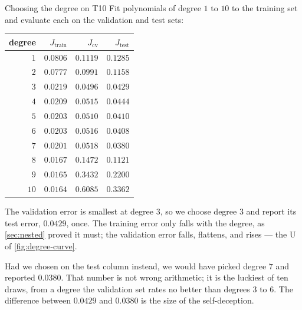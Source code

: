 \begin{workedexample}{Choosing the degree on T10}
Fit polynomials of degree $1$ to $10$ to the training set and evaluate each on
the validation and test sets:

\begin{center}
\small
\renewcommand{\arraystretch}{1.15}
\begin{tabular}{@{}rrrr@{}}
\toprule
degree & $J_{\text{train}}$ & $J_{\text{cv}}$ & $J_{\text{test}}$\\
\midrule
$1$  & $0.0806$ & $0.1119$ & $0.1285$\\
$2$  & $0.0777$ & $0.0991$ & $0.1158$\\
$3$  & $0.0219$ & $\mathbf{0.0496}$ & $0.0429$\\
$4$  & $0.0209$ & $0.0515$ & $0.0444$\\
$5$  & $0.0203$ & $0.0510$ & $0.0410$\\
$6$  & $0.0203$ & $0.0516$ & $0.0408$\\
$7$  & $0.0201$ & $0.0518$ & $0.0380$\\
$8$  & $0.0167$ & $0.1472$ & $0.1121$\\
$9$  & $0.0165$ & $0.3432$ & $0.2200$\\
$10$ & $0.0164$ & $0.6085$ & $0.3362$\\
\bottomrule
\end{tabular}
\end{center}

The validation error is smallest at degree $3$, so we choose degree $3$ and
report its test error, $0.0429$, once. The training error only falls with the
degree, as \cref{sec:nested} proved it must; the validation error falls,
flattens, and rises --- the U of \cref{fig:degree-curve}.

Had we chosen on the test column instead, we would have picked degree $7$ and
reported $0.0380$. That number is not wrong arithmetic; it is the luckiest of
ten draws, from a degree the validation set rates no better than degrees $3$ to
$6$. The difference between $0.0429$ and $0.0380$ is the size of the
self-deception.
\end{workedexample}

